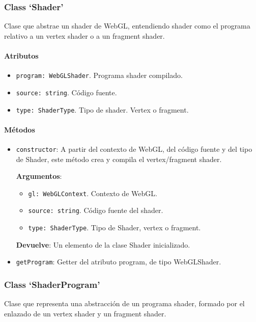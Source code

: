 \subsubsection{Class `Shader'}
Clase que abstrae un shader de WebGL, entendiendo shader como el programa relativo a un vertex shader o a un fragment shader. 

\paragraph*{Atributos}
\begin{itemize}
    \item \verb|program: WebGLShader|. Programa shader compilado.
    \item \verb|source: string|. Código fuente.
    \item \verb|type: ShaderType|. Tipo de shader. Vertex o fragment.
\end{itemize}

\paragraph*{Métodos}
\begin{itemize}
    \item \verb|constructor|: A partir del contexto de WebGL, del código fuente y del tipo de Shader, este método crea y compila el vertex/fragment shader.
    
    \textbf{Argumentos}:
    \begin{itemize}
        \item \verb|gl: WebGLContext|. Contexto de WebGL.
        \item \verb|source: string|. Código fuente del shader.
        \item \verb|type: ShaderType|. Tipo de Shader, vertex o fragment.
    \end{itemize}
    \textbf{Devuelve}: Un elemento de la clase Shader inicializado.

    \item \verb|getProgram|: Getter del atributo program, de tipo WebGLShader.
\end{itemize}

\subsubsection{Class `ShaderProgram'}
Clase que representa una abstracción de un programa shader, formado por el enlazado de un vertex shader y un fragment shader.

